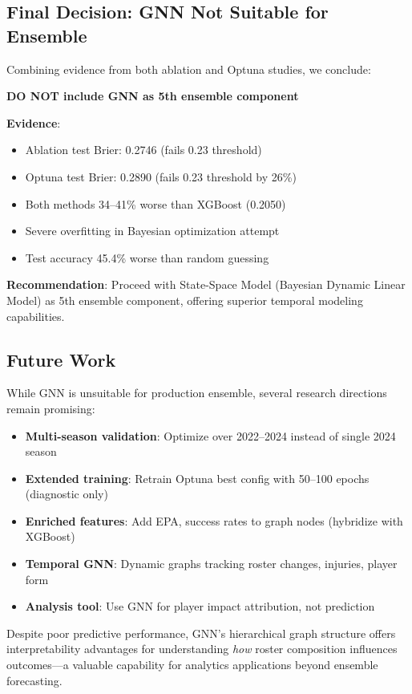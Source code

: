 \subsection{Final Decision: GNN Not Suitable for Ensemble}
\label{subsec:optuna_final_decision}

Combining evidence from both ablation and Optuna studies, we conclude:

\begin{tcolorbox}[colback=red!5!white, colframe=red!75!black, title=Final Ensemble Integration Decision]
\textbf{DO NOT include GNN as 5th ensemble component}

\textbf{Evidence}:
\begin{itemize}[noitemsep]
    \item Ablation test Brier: 0.2746 (fails 0.23 threshold)
    \item Optuna test Brier: 0.2890 (fails 0.23 threshold by 26\%)
    \item Both methods 34--41\% worse than XGBoost (0.2050)
    \item Severe overfitting in Bayesian optimization attempt
    \item Test accuracy 45.4\% worse than random guessing
\end{itemize}

\textbf{Recommendation}: Proceed with State-Space Model (Bayesian Dynamic Linear Model) as 5th ensemble component, offering superior temporal modeling capabilities.
\end{tcolorbox}

\subsection{Future Work}
\label{subsec:optuna_future_work}

While GNN is unsuitable for production ensemble, several research directions remain promising:

\begin{itemize}[noitemsep]
    \item \textbf{Multi-season validation}: Optimize over 2022--2024 instead of single 2024 season
    \item \textbf{Extended training}: Retrain Optuna best config with 50--100 epochs (diagnostic only)
    \item \textbf{Enriched features}: Add EPA, success rates to graph nodes (hybridize with XGBoost)
    \item \textbf{Temporal GNN}: Dynamic graphs tracking roster changes, injuries, player form
    \item \textbf{Analysis tool}: Use GNN for player impact attribution, not prediction
\end{itemize}

Despite poor predictive performance, GNN's hierarchical graph structure offers interpretability advantages for understanding \textit{how} roster composition influences outcomes—a valuable capability for analytics applications beyond ensemble forecasting.
